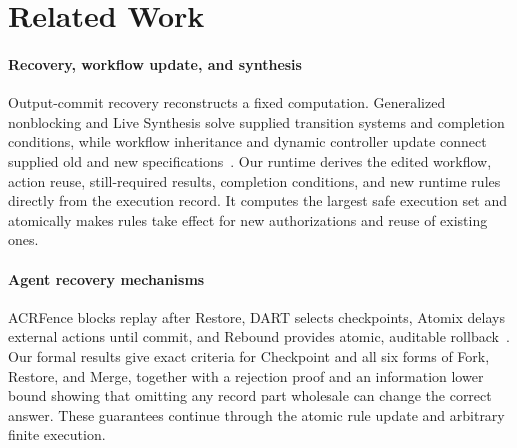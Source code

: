\section{Related Work}
\label{sec:related}

\paragraph{Recovery, workflow update, and synthesis}
Output-commit recovery reconstructs a fixed computation.
Generalized nonblocking and Live Synthesis solve supplied transition systems and completion conditions, while workflow inheritance and dynamic controller update connect supplied old and new specifications~\cite{strom1985optimistic,elnozahy2002rollback,dequeiroz2005multitasking,malik2008generalised,finkbeiner2022live,vanderaalst2002inheritance,nahabedian2020dynamic,amram2022dynamic}.
Our runtime derives the edited workflow, action reuse, still-required results, completion conditions, and new runtime rules directly from the execution record.
It computes the largest safe execution set and atomically makes rules take effect for new authorizations and reuse of existing ones.

\paragraph{Agent recovery mechanisms}
ACRFence blocks replay after Restore, DART selects checkpoints, Atomix delays external actions until commit, and Rebound provides atomic, auditable rollback~\cite{zheng2026acrfence,yang2026dart,mohammadi2026atomix,burke2026rebound}.
Our formal results give exact criteria for Checkpoint and all six forms of Fork, Restore, and Merge, together with a rejection proof and an information lower bound showing that omitting any record part wholesale can change the correct answer.
These guarantees continue through the atomic rule update and arbitrary finite execution.
